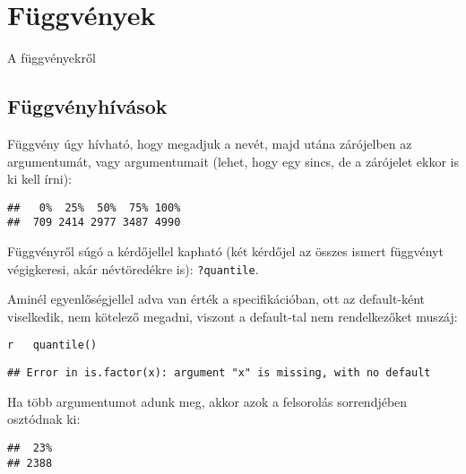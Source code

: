 \documentclass[]{book}
\newenvironment{Shaded}{\begin{snugshade}}{\end{snugshade}}
\newcommand{\KeywordTok}[1]{\textcolor[rgb]{0.13,0.29,0.53}{\textbf{#1}}}
\newcommand{\FloatTok}[1]{\textcolor[rgb]{0.00,0.00,0.81}{#1}}
\newcommand{\OperatorTok}[1]{\textcolor[rgb]{0.81,0.36,0.00}{\textbf{#1}}}
\newcommand{\NormalTok}[1]{#1}
\begin{document}
\chapter{Függvények}\label{fuggvenyek}

A függvényekről

\section{Függvényhívások}\label{fuggvenyhivasok}

Függvény úgy hívható, hogy megadjuk a nevét, majd utána zárójelben az
argumentumát, vagy argumentumait (lehet, hogy egy sincs, de a zárójelet
ekkor is ki kell írni):

\begin{Shaded}
\end{Shaded}

\begin{verbatim}
##   0%  25%  50%  75% 100% 
##  709 2414 2977 3487 4990
\end{verbatim}

Függvényről súgó a kérdőjellel kapható (két kérdőjel az összes ismert
függvényt végigkeresi, akár névtöredékre is): \texttt{?quantile}.

Aminél egyenlőségjellel adva van érték a specifikációban, ott az
default-ként viselkedik, nem kötelező megadni, viszont a default-tal nem
rendelkezőket muszáj:

\texttt{r\ \ \ quantile()}

\texttt{\#\#\ Error\ in\ is.factor(x):\ argument\ "x"\ is\ missing,\ with\ no\ default}

Ha több argumentumot adunk meg, akkor azok a felsorolás sorrendjében
osztódnak ki:

\begin{Shaded}
\end{Shaded}

\begin{verbatim}
##  23% 
## 2388
\end{verbatim}

\begin{Shaded}
\end{Shaded}
\end{document}
